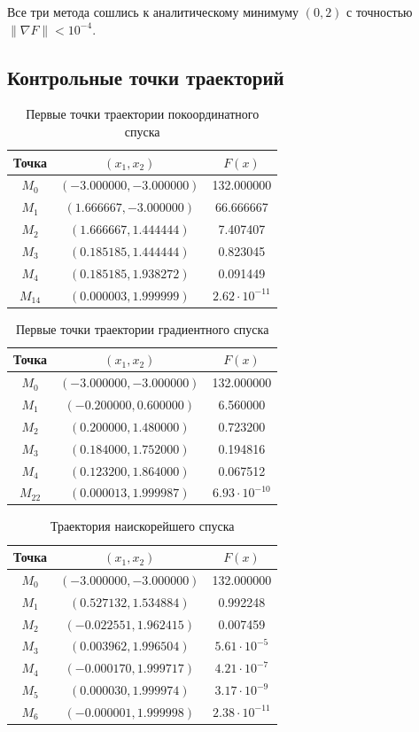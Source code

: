 \documentclass[12pt,a4paper]{article}
\begin{document}
Все три метода сошлись к аналитическому минимуму $(0,2)$ с точностью $\|\nabla F\|<10^{-4}$.

\subsection{Контрольные точки траекторий}

\begin{table}[H]
\centering
\caption{Первые точки траектории покоординатного спуска}
\begin{tabular}{ccc}
\toprule
Точка & $(x_1,x_2)$ & $F(x)$ \\
\midrule
$M_0$ & $(-3.000000,-3.000000)$ & 132.000000 \\
$M_1$ & $(1.666667,-3.000000)$ & 66.666667 \\
$M_2$ & $(1.666667,1.444444)$ & 7.407407 \\
$M_3$ & $(0.185185,1.444444)$ & 0.823045 \\
$M_4$ & $(0.185185,1.938272)$ & 0.091449 \\
$M_{14}$ & $(0.000003,1.999999)$ & $2.62\cdot 10^{-11}$ \\
\bottomrule
\end{tabular}
\end{table}

\begin{table}[H]
\centering
\caption{Первые точки траектории градиентного спуска}
\begin{tabular}{ccc}
\toprule
Точка & $(x_1,x_2)$ & $F(x)$ \\
\midrule
$M_0$ & $(-3.000000,-3.000000)$ & 132.000000 \\
$M_1$ & $(-0.200000,0.600000)$ & 6.560000 \\
$M_2$ & $(0.200000,1.480000)$ & 0.723200 \\
$M_3$ & $(0.184000,1.752000)$ & 0.194816 \\
$M_4$ & $(0.123200,1.864000)$ & 0.067512 \\
$M_{22}$ & $(0.000013,1.999987)$ & $6.93\cdot 10^{-10}$ \\
\bottomrule
\end{tabular}
\end{table}

\begin{table}[H]
\centering
\caption{Траектория наискорейшего спуска}
\begin{tabular}{ccc}
\toprule
Точка & $(x_1,x_2)$ & $F(x)$ \\
\midrule
$M_0$ & $(-3.000000,-3.000000)$ & 132.000000 \\
$M_1$ & $(0.527132,1.534884)$ & 0.992248 \\
$M_2$ & $(-0.022551,1.962415)$ & 0.007459 \\
$M_3$ & $(0.003962,1.996504)$ & $5.61\cdot 10^{-5}$ \\
$M_4$ & $(-0.000170,1.999717)$ & $4.21\cdot 10^{-7}$ \\
$M_5$ & $(0.000030,1.999974)$ & $3.17\cdot 10^{-9}$ \\
$M_6$ & $(-0.000001,1.999998)$ & $2.38\cdot 10^{-11}$ \\
\bottomrule
\end{tabular}
\end{table}
\end{document}
